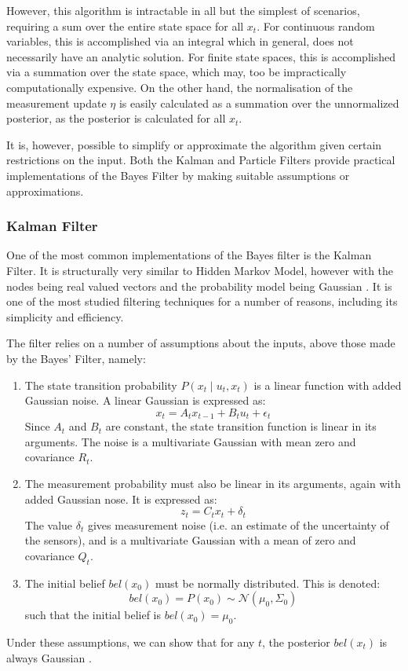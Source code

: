 \documentclass[english]{article}
\begin{document}
However, this algorithm is intractable in all but the simplest of scenarios, requiring a sum over the entire state space for all $x_t$. For continuous random variables, this is accomplished via an integral which in general, does not necessarily have an analytic solution. For finite state spaces, this is accomplished via a summation over the state space, which may, too be impractically computationally expensive. On the other hand, the normalisation of the measurement update $\eta$ is easily calculated as a summation over the unnormalized posterior, as the posterior is calculated for all $x_t$.

It is, however, possible to simplify or approximate the algorithm given certain restrictions on the input. Both the Kalman and Particle Filters provide practical implementations of the Bayes Filter by making suitable assumptions or approximations.

\subsubsection{Kalman Filter}
\label{sec:kalfilter}
One of the most common implementations of the Bayes filter is the Kalman Filter. It is structurally very similar to Hidden Markov Model, however with the nodes being real valued vectors and the probability model being Gaussian \cite{kalfilter}. It is one of the most studied filtering techniques for a number of reasons, including its simplicity and efficiency.

The filter relies on a number of assumptions about the inputs, above those made by the Bayes' Filter, namely:
\begin{enumerate}
	\item The state transition probability $P(x_{t} \mid u_t,x_t)$ is a linear function with added Gaussian noise. A linear Gaussian is expressed as:
		\begin{equation}
			x_{t} = A_{t} x_{t-1} + B_{t} u_{t} + \epsilon _{t}
		\end{equation}
		Since $A_{t}$ and $B_{t}$ are constant, the state transition function is linear in its arguments. The noise is a multivariate Gaussian with mean zero and covariance $R_t$.
	\item The measurement probability must also be linear in its arguments, again with added Gaussian nose. It is expressed as:
		\begin{equation}
			z_{t} = C_{t} x_{t} + \delta _{t}
		\end{equation}
		The value $\delta_t$ gives measurement noise (i.e. an estimate of the uncertainty of the sensors), and is a multivariate Gaussian with a mean of zero and covariance $Q_t$.
	\item The initial belief $bel(x_0)$ must be normally distributed. This is denoted:
		\begin{equation}
			bel(x_0) = P(x_0) \sim \mathcal{N}(\mu_0, \Sigma_0)
		\end{equation}
		such that the initial belief is $bel(x_0)=\mu_0$.
\end{enumerate}
Under these assumptions, we can show that for any $t$, the posterior $bel(x_{t})$ is always Gaussian \cite{kalmanderiv}.
\end{document}

